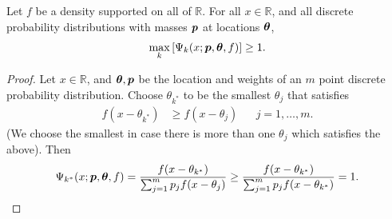 		\begin{lemma}
		\label{lem:maxkGamma}
		Let $f$ be a density supported on all of $\mathbb{R}$. For all $x \in \mathbb{R}$, and all discrete probability distributions with masses ${\bm{{p}}}$ at locations ${\bm{{\theta}}}$,
			\begin{equation}
				\max_k \left[ \Psi_k(x;{\bm{{p}}},{\bm{{\theta}}},f) \right] \geq 1.
			\end{equation}
		\end{lemma}	
		\begin{proof}
			Let $x \in \mathbb{R}$, and ${\bm{{\theta}}},{\bm{{p}}}$ be the location and weights of an $m$ point discrete probability distribution. Choose $\theta_{k^*}$ to be the smallest $\theta_j$ that satisfies
			\begin{align}
				f(x - \theta_{k^*}) &\geq f(x - \theta_j) && j = 1, \dots, m.
			\end{align}
			(We choose the smallest in case there is more than one $\theta_j$ which satisfies the above). Then
			\begin{equation}
				\Psi_{k^*}(x;{\bm{{p}}},{\bm{{\theta}}},f) = \frac{f(x - \theta_{k^*})}{\sum_{j=1}^m p_j f(x - \theta_j)} \geq \frac{f(x - \theta_{k^*})}{\sum_{j=1}^m p_j f(x - \theta_{k^*})} = 1.
			\end{equation}
		\end{proof}




